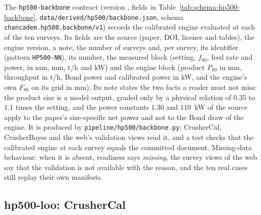 The \texttt{hp500-backbone} contract (version , fields in Table~\ref{tab:schema-hp500-backbone}, \texttt{data/\allowbreak{}derived/\allowbreak{}hp500/\allowbreak{}backbone.json}, schema
\texttt{chancadem.hp500.backbone/\allowbreak{}v1}) records the calibrated engine evaluated at each of the ten surveys. Its fields are the
source (paper, DOI, licence and tables), the engine version, a note, the number of surveys and, per survey, its identifier
(pattern \texttt{HP500-NN}), its number, the measured block (setting, $f_{80}$, feed rate and power, in mm, mm, t/h and kW) and
the engine block (product $P_{80}$ in mm, throughput in t/h, Bond power and calibrated power in kW, and the engine's own $F_{80}$
on its grid in mm). Its note states the two facts a reader must not miss: the product size is a model output, graded only by a
physical relation of $0.35$ to $1.1$ times the setting, and the power constants $1.30$ and $110$~kW of the source apply to the
paper's size-specific net power and not to the Bond draw of the engine. It is produced by \texttt{pipeline/\allowbreak{}hp500/\allowbreak{}backbone.py};
CrusherCal, CrusherBayes and the web's validation views read it, and a test checks that the calibrated engine at each survey
equals the committed document. Missing-data behaviour: when it is absent, readiness says \emph{missing}, the survey views of the
web say that the validation is not available with the reason, and the ten real cases still replay their own manifests.

\subsection{hp500-loo: CrusherCal}\label{sec:data-loo}

